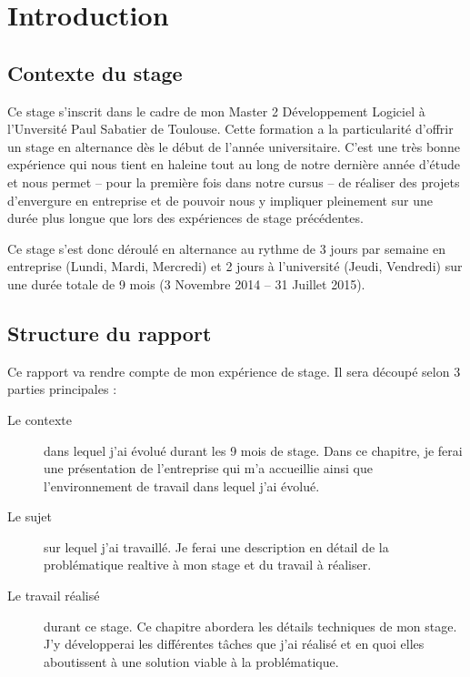 \chapter{Introduction}

\section*{Contexte du stage}
Ce stage s'inscrit dans le cadre de mon Master 2 Développement Logiciel à l'Unversité Paul Sabatier de Toulouse. Cette formation a la particularité d'offrir un stage en alternance dès le début de l'année universitaire. C'est une très bonne expérience qui nous tient en haleine tout au long de notre dernière année d'étude et nous permet -- pour la première fois dans notre cursus -- de réaliser des projets d'envergure en entreprise et de pouvoir nous y impliquer pleinement sur une durée plus longue que lors des expériences de stage précédentes.

Ce stage s'est donc déroulé en alternance au rythme de 3 jours par semaine en entreprise (Lundi, Mardi, Mercredi) et 2 jours à l'université (Jeudi, Vendredi) sur une durée totale de 9 mois (3 Novembre 2014 -- 31 Juillet 2015).

\section*{Structure du rapport}
Ce rapport va rendre compte de mon expérience de stage. Il sera découpé selon 3 parties principales :
\begin{description}
	\item[Le contexte] dans lequel j'ai évolué durant les 9 mois de stage. Dans ce chapitre, je ferai une présentation de l'entreprise qui m'a accueillie ainsi que l'environnement de travail dans lequel j'ai évolué.
	\item[Le sujet] sur lequel j'ai travaillé. Je ferai une description en détail de la problématique realtive à mon stage et du travail à réaliser.
	\item[Le travail réalisé] durant ce stage. Ce chapitre abordera les détails techniques de mon stage. J'y développerai les différentes tâches que j'ai réalisé et en quoi elles aboutissent à une solution viable à la problématique.
\end{description}

